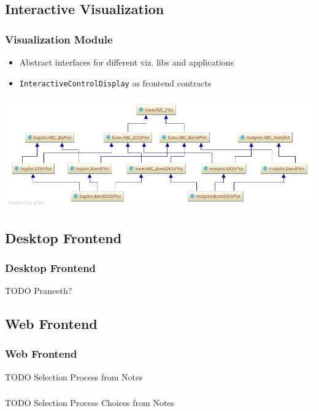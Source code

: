 \documentclass{beamer}
\begin{document}
\subsection{Interactive Visualization}
\label{sec:visualization}

\newcommand{\theimage}{\includegraphics[width=1.1\linewidth]{img/pycharm_uml/matplot.png}}%
\begin{frame}\frametitle{Visualization Module}
    \begin{itemize}
    \item Abstract interfaces for different viz. libs and applications
    \item \texttt{InteractiveControlDisplay} as frontend contracts 
    \end{itemize}    
    \centerline{\theimage}
\end{frame}

\subsection{Desktop Frontend}
\label{sec:desktop-frontend}

\begin{frame}\frametitle{Desktop Frontend}
    TODO Praneeth?
\end{frame}

\subsection{Web Frontend}
\label{sec:web-frontend}

\begin{frame}\frametitle{Web Frontend}
    TODO Selection Process from Notes 
\end{frame}

\begin{frame}\frametitle{}
    TODO Selection Process Choices from Notes 
\end{frame}
\end{document}
